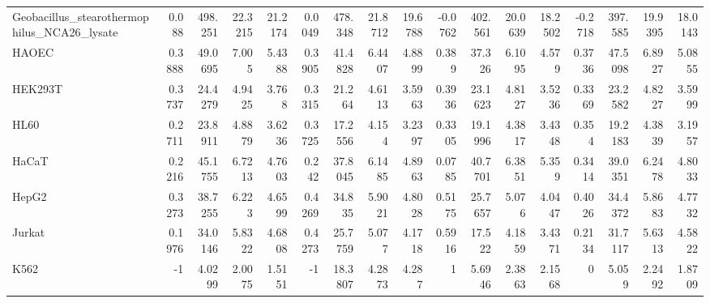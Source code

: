\begin{tabular}{lrrrrrrrrrrrrrrrr}
 Geobacillus\_stearothermophilus\_NCA26\_lysate &              0.088    &         498.251  &          22.3215  &          21.2174 &         0.0049   &    478.348  &     21.8712  &    19.6788  &      -0.0762   &  402.561  &   20.0639  &  18.2502  &        -0.2718   &    397.585  &      19.9395 &    18.0143  \\
 HAOEC                                       &              0.3888   &          49.0695 &           7.005   &           5.4388 &         0.3905   &     41.4828 &      6.4407  &     4.8899  &       0.389    &   37.326  &    6.1095  &   4.579   &         0.3736   &     47.5098 &       6.8927 &     5.0855  \\
 HEK293T                                     &              0.3737   &          24.4279 &           4.9425  &           3.768  &         0.3315   &     21.264  &      4.6113  &     3.5963  &       0.3936   &   23.1623 &    4.8127  &   3.5236  &         0.3369   &     23.2582 &       4.8227 &     3.5999  \\
 HL60                                        &              0.2711   &          23.8911 &           4.8879  &           3.6236 &         0.3725   &     17.2556 &      4.154   &     3.2397  &       0.3305   &   19.1996 &    4.3817  &   3.4348  &         0.354    &     19.2183 &       4.3839 &     3.1957  \\
 HaCaT                                       &              0.2216   &          45.1755 &           6.7213  &           4.7603 &         0.242    &     37.8045 &      6.1485  &     4.8963  &       0.0785   &   40.7701 &    6.3851  &   5.359   &         0.3414   &     39.0351 &       6.2478 &     4.8033  \\
 HepG2                                       &              0.3273   &          38.7255 &           6.223   &           4.6599 &         0.4269   &     34.835  &      5.9021  &     4.8028  &       0.5175   &   25.7657 &    5.076   &   4.0447  &         0.4026   &     34.4372 &       5.8683 &     4.7732  \\
 Jurkat                                      &              0.1976   &          34.0146 &           5.8322  &           4.6808 &         0.4273   &     25.7759 &      5.077   &     4.1718  &       0.5916   &   17.522  &    4.1859  &   3.4371  &         0.2134   &     31.7117 &       5.6313 &     4.5822  \\
 K562                                        &             -1        &           4.0299 &           2.0075  &           1.5151 &        -1        &     18.3807 &      4.2873  &     4.287   &       1        &    5.6946 &    2.3863  &   2.1568  &         0        &      5.059  &       2.2492 &     1.8709  \\

\end{tabular}
